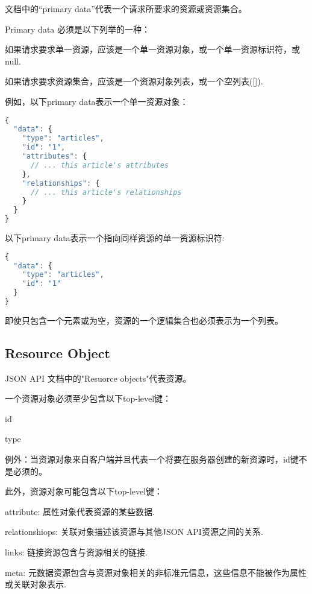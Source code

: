 文档中的“primary data”代表一个请求所要求的资源或资源集合。

Primary data 必须是以下列举的一种：

\begin{compactitem}
\item 如果请求要求单一资源，应该是一个单一资源对象，或一个单一资源标识符，或null.
\item 如果请求要求资源集合，应该是一个资源对象列表，或一个空列表([]).
\end{compactitem}

例如，以下primary data表示一个单一资源对象：

\begin{lstlisting}[language=JavaScript]
{
  "data": {
    "type": "articles",
    "id": "1",
    "attributes": {
      // ... this article's attributes
    },
    "relationships": {
      // ... this article's relationships
    }
  }
}
\end{lstlisting}

以下primary data表示一个指向同样资源的单一资源标识符:

\begin{lstlisting}[language=JavaScript]
{
  "data": {
    "type": "articles",
    "id": "1"
  }
}
\end{lstlisting}


即使只包含一个元素或为空，资源的一个逻辑集合也必须表示为一个列表。


\subsection{Resource Object}

JSON API 文档中的"Resuorce objects"代表资源。

一个资源对象必须至少包含以下top-level键：

\begin{compactitem}
\item id
\item type
\end{compactitem}

例外：当资源对象来自客户端并且代表一个将要在服务器创建的新资源时，id键不是必须的。

此外，资源对象可能包含以下top-level键：

\begin{compactitem}
\item attribute: 属性对象代表资源的某些数据.
\item relationshiops: 关联对象描述该资源与其他JSON API资源之间的关系.
\item links: 链接资源包含与资源相关的链接.
\item meta: 元数据资源包含与资源对象相关的非标准元信息，这些信息不能被作为属性或关联对象表示.
\end{compactitem}

